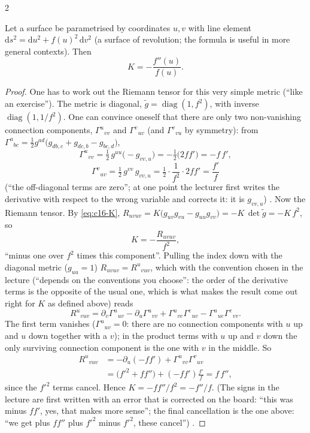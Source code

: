 \begin{paracol}{2}
\begin{lemma}\label{lem:c16-gauss}
Let a surface be parametrised by coordinates $u,v$ with line element $\mathrm ds^2=\mathrm du^2+f(u)^2\,\mathrm dv^2$ (a surface of revolution; the formula is useful in more general contexts). Then
\[
  K=-\frac{f''(u)}{f(u)}.
\]
\end{lemma}
\begin{proof}
One has to work out the Riemann tensor for this very simple metric (``like an exercise''). The metric is diagonal, $\tilde g=\operatorname{diag}(1,f^2)$, with inverse $\operatorname{diag}(1,1/f^2)$. One can convince oneself that there are only two non-vanishing connection components, $\Gamma^u{}_{vv}$ and $\Gamma^v{}_{uv}$ (and $\Gamma^v{}_{vu}$ by symmetry): from $\Gamma^a{}_{bc}=\tfrac12g^{ad}\bigl(g_{db,c}+g_{dc,b}-g_{bc,d}\bigr)$,
\[
  \Gamma^u{}_{vv}=\tfrac12\,g^{uu}\bigl(-g_{vv,u}\bigr)=-\tfrac12\bigl(2ff'\bigr)=-f\,f',
\]
\[
  \Gamma^v{}_{uv}=\tfrac12\,g^{vv}\,g_{vv,u}=\tfrac12\cdot\frac1{f^2}\cdot2ff'=\frac{f'}{f}
\]
(``the off-diagonal terms are zero''; at one point the lecturer first writes the derivative with respect to the wrong variable and corrects it: it is $g_{vv,u}$) .
Now the Riemann tensor. By \eqref{eq:c16-K}, $R_{uvuv}=K\bigl(g_{uv}g_{vu}-g_{uu}g_{vv}\bigr)=-K\,\det\tilde g=-K\,f^2$, so
\[
  K=-\frac{R_{uvuv}}{f^2},
\]
``minus one over $f^2$ times this component''. Pulling the index down with the diagonal metric ($g_{uu}=1$) $R_{uvuv}=R^u{}_{vuv}$, which with the convention chosen in the lecture (``depends on the conventions you choose'': the order of the derivative terms is the opposite of the usual one, which is what makes the result come out right for $K$ as defined above) reads
\[
  R^u{}_{vuv}=\partial_v\Gamma^u{}_{uv}-\partial_u\Gamma^u{}_{vv}+\Gamma^u{}_{ve}\Gamma^e{}_{uv}-\Gamma^u{}_{ue}\Gamma^e{}_{vv}.
\]
The first term vanishes ($\Gamma^u{}_{uv}=0$: there are no connection components with $u$ up and $u$ down together with a $v$); in the product terms with $u$ up and $v$ down the only surviving connection component is the one with $v$ in the middle. So
\[\begin{aligned}
  R^u{}_{vuv}&=-\partial_u(-ff')+\Gamma^u{}_{vv}\Gamma^v{}_{uv}\\
  &=\bigl(f'^2+ff''\bigr)+(-ff')\frac{f'}{f}=f\,f'' ,
\end{aligned}\]
since the $f'^2$ terms cancel. Hence $K=-ff''/f^2=-f''/f$. (The signs in the lecture are first written with an error that is corrected on the board: ``this was minus $ff'$, yes, that makes more sense''; the final cancellation is the one above: ``we get plus $ff''$ plus $f'^2$ minus $f'^2$, these cancel'') .
\end{proof}


\end{paracol}
